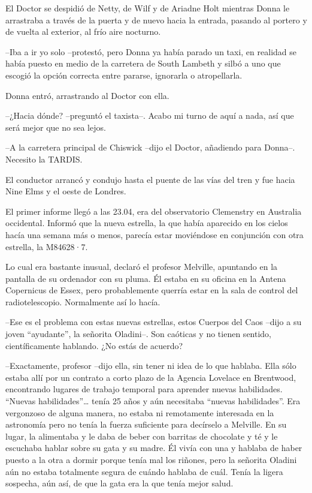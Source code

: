 El Doctor se despidió de Netty, de Wilf y de Ariadne Holt mientras Donna
le arrastraba a través de la puerta y de nuevo hacia la entrada, pasando
al portero y de vuelta al exterior, al frío aire nocturno.

--Iba a ir yo solo --protestó, pero Donna ya había parado un taxi,  en
realidad se había puesto en medio de la carretera de South Lambeth y
silbó a uno que escogió la opción correcta entre pararse, ignorarla o
atropellarla.

Donna entró, arrastrando al Doctor con ella.

--¿Hacia dónde? --preguntó el taxista--. Acabo mi turno de aquí a nada,
así que será mejor que no sea lejos.

--A la carretera principal de Chiswick --dijo el Doctor,  añadiendo para
Donna--. Necesito la TARDIS.

El conductor arrancó y condujo hasta el puente de las vías del tren y
fue hacia Nine Elms y el oeste de Londres.

El primer informe llegó a las 23.04, era del observatorio Clemenstry en
Australia occidental. Informó que la nueva estrella, la que había
aparecido en los cielos hacía una semana más o menos, parecía estar
moviéndose en conjunción con otra estrella, la M84628·7.

Lo cual era bastante inusual, declaró el profesor Melville, apuntando en
la pantalla de su ordenador con su pluma. Él estaba en su oficina en la
Antena Copernicus de Essex, pero probablemente querría estar en la sala
de control del radiotelescopio. Normalmente así lo hacía.

--Ese es el problema con estas nuevas estrellas, estos Cuerpos del Caos
--dijo a su joven ``ayudante'', la señorita Oladini--. Son caóticas y no
tienen sentido, científicamente hablando. ¿No estás de acuerdo?

--Exactamente, profesor --dijo ella, sin tener ni idea de lo que
hablaba. Ella sólo estaba allí por un contrato a corto plazo de la
Agencia Lovelace en Brentwood, encontrando lugares de trabajo temporal
para aprender nuevas habilidades. ``Nuevas habilidades''\ldots{} tenía
25 años y aún necesitaba ``nuevas habilidades''. Era vergonzoso de
alguna manera, no estaba ni remotamente interesada en la astronomía pero
no tenía la fuerza suficiente para decírselo a Melville. En su lugar, la
alimentaba y le daba de beber con barritas de chocolate y té y le
escuchaba hablar sobre su gata y su madre. Él vivía con una y hablaba de
haber puesto a la otra a dormir porque tenía mal los riñones, pero la
señorita Oladini aún no estaba totalmente segura de cuándo hablaba de
cuál. Tenía la ligera sospecha, aún así, de que la gata era la que tenía
mejor salud.

